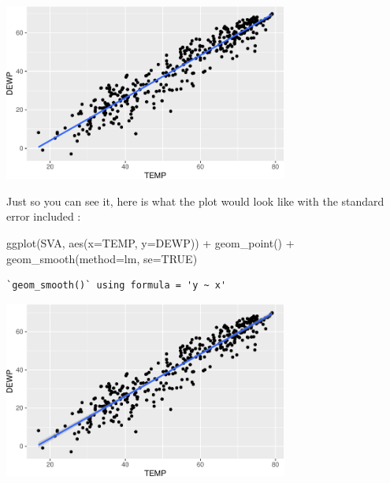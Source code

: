 \documentclass[
  letterpaper,
  DIV=11,
  numbers=noendperiod]{scrreprt}
\newenvironment{Shaded}{\begin{snugshade}}{\end{snugshade}}
\newcommand{\AttributeTok}[1]{\textcolor[rgb]{0.40,0.45,0.13}{#1}}
\newcommand{\ConstantTok}[1]{\textcolor[rgb]{0.56,0.35,0.01}{#1}}
\newcommand{\FunctionTok}[1]{\textcolor[rgb]{0.28,0.35,0.67}{#1}}
\newcommand{\NormalTok}[1]{\textcolor[rgb]{0.00,0.23,0.31}{#1}}
\newcommand{\SpecialCharTok}[1]{\textcolor[rgb]{0.37,0.37,0.37}{#1}}
\newcommand{\StringTok}[1]{\textcolor[rgb]{0.13,0.47,0.30}{#1}}
\begin{document}
\begin{center}
\includegraphics[width=0.7\textwidth,height=\textheight]{Linear_Modeling_and_Regression_files/figure-pdf/unnamed-chunk-12-1.pdf}
\end{center}

Just so you can see it, here is what the plot would look like with the
standard error included :

\begin{Shaded}
\begin{Highlighting}[]
\FunctionTok{ggplot}\NormalTok{(SVA, }\FunctionTok{aes}\NormalTok{(}\AttributeTok{x=}\NormalTok{TEMP, }\AttributeTok{y=}\NormalTok{DEWP)) }\SpecialCharTok{+}
  \FunctionTok{geom\_point}\NormalTok{() }\SpecialCharTok{+}
  \FunctionTok{geom\_smooth}\NormalTok{(}\AttributeTok{method=}\StringTok{\textquotesingle{}lm\textquotesingle{}}\NormalTok{, }\AttributeTok{se=}\ConstantTok{TRUE}\NormalTok{)}
\end{Highlighting}
\end{Shaded}

\begin{verbatim}
`geom_smooth()` using formula = 'y ~ x'
\end{verbatim}

\begin{center}
\includegraphics[width=0.7\textwidth,height=\textheight]{Linear_Modeling_and_Regression_files/figure-pdf/unnamed-chunk-13-1.pdf}
\end{center}
\end{document}
